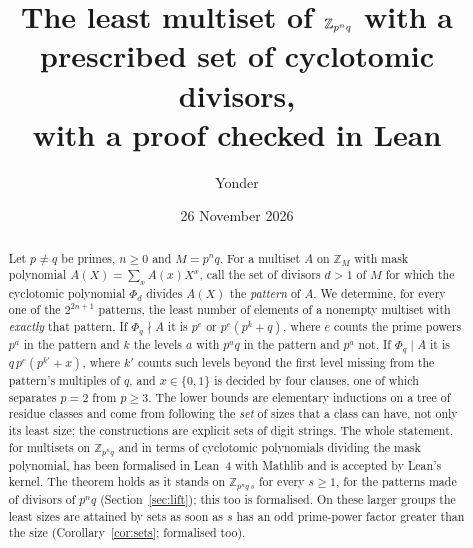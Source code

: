 \documentclass[11pt,a4paper]{amsart}
\title[The least multiset of $\Z_{p^nq}$ with given cyclotomic divisors]{The least multiset of $\Z_{p^nq}$
with a prescribed set of cyclotomic divisors,\\ with a proof checked in Lean}
\author{Yonder}
\date{26 November 2026}
\theoremstyle{definition}
\theoremstyle{remark}
\newcommand{\Z}{\mathbb{Z}}
\begin{document}
\begin{abstract}
Let $p\ne q$ be primes, $n\ge 0$ and $M=p^nq$. For a multiset $A$ on $\Z_M$ with mask polynomial
$A(X)=\sum_x A(x)X^x$, call the set of divisors $d>1$ of $M$ for which the cyclotomic polynomial $\Phi_d$ divides $A(X)$ the \emph{pattern} of $A$.
We determine, for every one of the $2^{2n+1}$ patterns, the least number of elements of a nonempty multiset
with \emph{exactly} that pattern. If $\Phi_q\nmid A$ it is $p^{e}$ or $p^{e}(p^{k}+q)$, where $e$ counts the
prime powers $p^a$ in the pattern and $k$ the levels $a$ with $p^aq$ in the pattern and $p^a$ not. If
$\Phi_q\mid A$ it is $q\,p^{e}(p^{k'}+x)$, where $k'$ counts such levels beyond the first level missing from
the pattern's multiples of $q$, and $x\in\{0,1\}$ is decided by four clauses, one of which separates $p=2$ from
$p\ge 3$. The lower bounds are elementary inductions on a tree of residue classes and come from following the \emph{set} of sizes that a class can have, not only its least size; the constructions are explicit sets of digit strings.
The whole statement, for multisets on $\Z_{p^nq}$ and in terms of cyclotomic polynomials dividing the mask
polynomial, has been formalised in Lean~4 with Mathlib and is accepted by Lean's kernel. The theorem holds as it stands on $\Z_{p^nq\,s}$ for every $s\ge1$, for the patterns made of divisors of $p^nq$ (Section~\ref{sec:lift}); this too is formalised. On these larger groups the least sizes are attained by sets as soon as $s$ has an odd prime-power factor greater than the size (Corollary~\ref{cor:sets}; formalised too).
\end{abstract}

\maketitle
\end{document}
